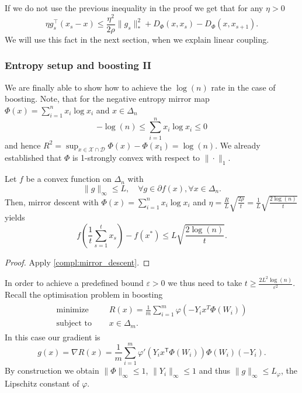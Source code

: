 \begin{remark}\label{mirror_descent_lemma_for_linear_coupling}
    If we do not use the previous inequality in the proof we get that for any $\eta > 0$
    \[
    \eta g_s^\top(x_s - x) \leq \frac{\eta^2}{2\rho} \|g_s\|_\ast^2 + D_\Phi(x, x_s) - D_\Phi(x, x_{s+1}).
    \]
    We will use this fact in the next section, when we explain linear coupling.
\end{remark}

\subsubsection{Entropy setup and boosting II}

We are finally able to show how to achieve the $\log(n)$ rate in the case of boosting. Note, that for the negative entropy mirror map $\Phi(x) = \sum_{i=1}^n x_i \log x_i$ and $x\in \Delta_n$
\begin{equation*}
	 -\log(n) \leq \sum_{i=1}^n x_i \log x_i \leq 0
\end{equation*}
and hence $R^2 = \sup_{x\in \mathcal{X}\cap\mathcal{D}}\Phi(x)-\Phi(x_1) = \log(n)$. We already established that $\Phi$ is 1-strongly convex with respect to $\|\cdot\|_1$.

\begin{corollary}
Let $f$ be a convex function on $\Delta_n$ with
\begin{equation*}
	\|g\|_\infty \leq L, \quad \forall g \in \partial f(x), \forall x\in \Delta_n.
\end{equation*}
Then, mirror descent with $\Phi(x) = \sum_{i=1}^n x_i \log x_i$ and $\eta =\frac{R}{L}\sqrt{\frac{2\rho}{t}}= \frac{1}{L}\sqrt{\frac{2\log(n)}{t}}$ yields
\begin{equation*}
	f\left(\frac{1}{t}\sum_{s=1}^t x_s \right) - f(x^*) \leq L\sqrt{\frac{2\log(n)}{t}}.
\end{equation*}
\end{corollary}

\begin{proof}
Apply \autoref{compl:mirror_descent}.
\end{proof}

In order to achieve a predefined bound $\varepsilon > 0$ we thus need to take $t \geq \frac{2L^2\log(n)}{\varepsilon^2}$.
Recall the optimisation problem in boosting
\begin{align*}
	\begin{aligned}
		\text{minimize }\quad   & R(x) = \frac{1}{m} \sum_{i=1}^m \varphi(-Y_ix^T\Phi(W_i))\\
		\text{subject to }\quad & x\in \Delta_m.
	\end{aligned}
\end{align*}
In this case our gradient is
\begin{equation*}
	g(x) = \nabla R(x) = \frac{1}{m}\sum_{i=1}^m \varphi'\left(Y_i x^\mathsf{T}\Phi(W_i)\right)\Phi(W_i)(-Y_i).
\end{equation*}
By construction we obtain $\|\Phi\|_\infty \leq 1$, $\|Y_i\|_\infty\leq 1$ and thus $\|g\|_\infty \leq L_\varphi$, the Lipschitz constant of $\varphi$.
